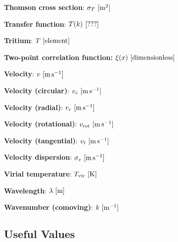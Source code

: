 \documentclass[a4paper,11pt]{article}
\begin{document}
{\noindent}\textbf{Thomson cross section}: $\sigma_T ~ [{\rm m^2}]$

{\noindent}\textbf{Transfer function}: $T(k) ~ [{\rm ???}]$

{\noindent}\textbf{Tritium}: $T ~ [{\rm element}]$

{\noindent}\textbf{Two-point correlation function:} $\xi(x) ~ [{\rm dimensionless}]$

{\noindent}\textbf{Velocity}: $v ~ [{\rm m\,s^{-1}}]$

{\noindent}\textbf{Velocity (circular)}: $v_c ~ [{\rm m\,s^{-1}}]$

{\noindent}\textbf{Velocity (radial)}: $v_r ~ [{\rm m\,s^{-1}}]$

{\noindent}\textbf{Velocity (rotational)}: $v_\mathrm{rot} ~ [{\rm m\,s^{-1}}]$

{\noindent}\textbf{Velocity (tangential)}: $v_t ~ [{\rm m\,s^{-1}}]$

{\noindent}\textbf{Velocity dispersion}: $\sigma_v ~ [{\rm m\,s^{-1}}]$

{\noindent}\textbf{Virial temperature}: $T_\mathrm{vir} ~ [{\rm K}]$

{\noindent}\textbf{Wavelength}: $\lambda ~ [{\rm m}]$

{\noindent}\textbf{Wavenumber (comoving)}: $k ~ [{\rm m^{-1}}]$






































\newpage
\subsection{Useful Values}
\end{document}
